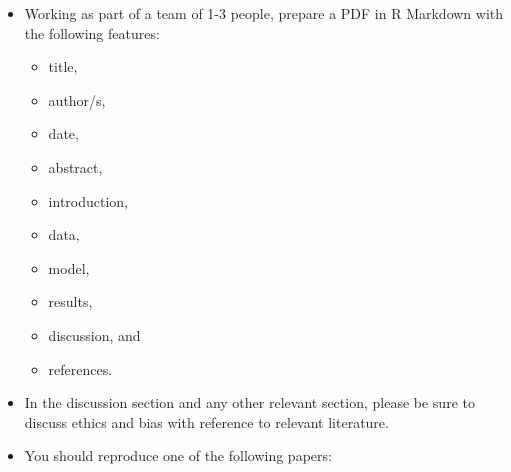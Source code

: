 \documentclass[
]{book}
\providecommand{\tightlist}{%
  \setlength{\itemsep}{0pt}\setlength{\parskip}{0pt}}
\begin{document}
\begin{itemize}
\tightlist
\item
  Working as part of a team of 1-3 people, prepare a PDF in R Markdown with the following features:

  \begin{itemize}
  \tightlist
  \item
    title,
  \item
    author/s,
  \item
    date,
  \item
    abstract,
  \item
    introduction,
  \item
    data,
  \item
    model,
  \item
    results,
  \item
    discussion, and
  \item
    references.
  \end{itemize}
\item
  In the discussion section and any other relevant section, please be sure to discuss ethics and bias with reference to relevant literature.
\item
  You should reproduce one of the following papers:


\end{itemize}
\end{document}
